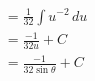 \documentclass[preview]{standalone}
\begin{document}
\begin{align*}
&=\frac{1}{32} \int u^{-2} \, du \\ &=\frac{-1}{32u}+C \\ &=\frac{-1}{32\sin\theta}+C
\end{align*}
\end{document}
